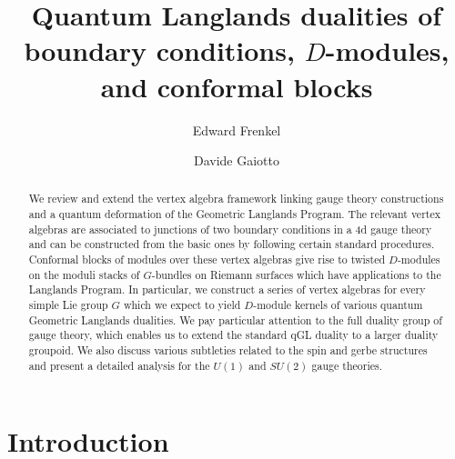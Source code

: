 \documentclass[11pt,reqno]{amsart}
\theoremstyle{plain}
\numberwithin{equation}{section}
\theoremstyle{definition}
\begin{document}
\title[Quantum Langlands dualities]{Quantum Langlands dualities of
  boundary conditions, $D$-modules, and conformal blocks}

\author{Edward Frenkel}

\address{Department of Mathematics, University of California,
  Berkeley, CA 94720, USA}

\author{Davide Gaiotto}

\address{Perimeter Institute for Theoretical Physics, Waterloo,
  Ontario, N2L 2Y5, Canada}

\begin{abstract}
  We review and extend the vertex algebra framework linking gauge
  theory constructions and a quantum deformation of the Geometric
  Langlands Program. The relevant vertex algebras are associated to
  junctions of two boundary conditions in a 4d gauge theory and can be
  constructed from the basic ones by following certain standard
  procedures. Conformal blocks of modules over these vertex algebras
  give rise to twisted $D$-modules on the moduli stacks of $G$-bundles
  on Riemann surfaces which have applications to the Langlands
  Program. In particular, we construct a series of vertex algebras for
  every simple Lie group $G$ which we expect to yield $D$-module
  kernels of various quantum Geometric Langlands dualities. We pay
  particular attention to the full duality group of gauge theory,
  which enables us to extend the standard qGL duality to a larger
  duality groupoid. We also discuss various subtleties related to the
  spin and gerbe structures and present a detailed analysis for the
  $U(1)$ and $SU(2)$ gauge theories.
\end{abstract}

\maketitle

\setcounter{tocdepth}{1}
\tableofcontents

\section{Introduction}
\end{document}
